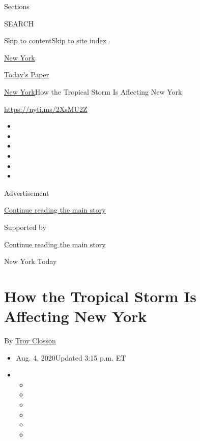 Sections

SEARCH

\protect\hyperlink{site-content}{Skip to
content}\protect\hyperlink{site-index}{Skip to site index}

\href{https://www.nytimes3xbfgragh.onion/section/nyregion}{New York}

\href{https://myaccount.nytimes3xbfgragh.onion/auth/login?response_type=cookie\&client_id=vi}{}

\href{https://www.nytimes3xbfgragh.onion/section/todayspaper}{Today's
Paper}

\href{/section/nyregion}{New York}\textbar{}How the Tropical Storm Is
Affecting New York

\url{https://nyti.ms/2XsMU2Z}

\begin{itemize}
\item
\item
\item
\item
\item
\item
\end{itemize}

Advertisement

\protect\hyperlink{after-top}{Continue reading the main story}

Supported by

\protect\hyperlink{after-sponsor}{Continue reading the main story}

New York Today

\hypertarget{how-the-tropical-storm-is-affecting-new-york}{%
\section{How the Tropical Storm Is Affecting New
York}\label{how-the-tropical-storm-is-affecting-new-york}}

By \href{https://www.nytimes3xbfgragh.onion/by/troy-closson}{Troy
Closson}

\begin{itemize}
\item
  Aug. 4, 2020Updated 3:15 p.m. ET
\item
  \begin{itemize}
  \item
  \item
  \item
  \item
  \item
  \item
  \end{itemize}
\end{itemize}

